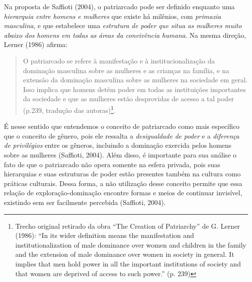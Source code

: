 Na proposta de Saffioti (2004), o patriarcado pode ser definido enquanto uma \textit{hierarquia entre homens e mulheres} que existe há milênios, com \textit{primazia masculina}, e que estabelece uma \textit{estrutura de poder que situa as mulheres muito abaixo dos homens em todas as áreas da convivência humana}. Na mesma direção, Lerner (1986) afirma:

\begin{quote}
    O patriarcado se refere à manifestação e à institucionalização da dominação masculina sobre as mulheres e as crianças na família, e na extensão da dominação masculina sobre as mulheres na sociedade em geral. Isso implica que homens detêm poder em todas as instituições importantes da sociedade e que as mulheres estão desprovidas de acesso a tal poder (p.239, tradução das autoras)\footnote{Trecho original retirado da obra ``The Creation of Patriarchy'' de G. Lerner (1986): ``In its wider definition means the manifestation and institutionalization of male dominance over women and children in the family and the extension of male dominance over women in society in general. It implies that men hold power in all the important institutions of society and that women are deprived of access to such power.'' (p. 239)}.
\end{quote}

É nesse sentido que entendemos o conceito de patriarcado como mais específico que o conceito de gênero, pois ele ressalta a \textit{desigualdade de poder} e a \textit{diferença de privilégios} entre os gêneros, incluindo a dominação exercida pelos homens sobre as mulheres (Saffioti, 2004). Além disso, é importante para sua análise o fato de que o patriarcado não opera somente na esfera privada, pois suas hierarquias e suas estruturas de poder estão presentes também na cultura como práticas culturais. Dessa forma, a não utilização desse conceito permite que essa relação de exploração-dominação encontre formas e meios de continuar invisível, existindo sem ser facilmente percebida (Saffioti, 2004). 

